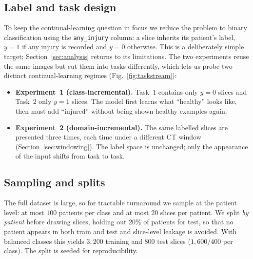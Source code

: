 \documentclass[11pt]{article}
\begin{document}
\subsection{Label and task design}
To keep the continual-learning question in focus we reduce the problem to binary
classification using the \texttt{any\_injury} column: a slice inherits its
patient's label, $y=1$ if any injury is recorded and $y=0$ otherwise. This is a
deliberately simple target; Section~\ref{sec:analysis} returns to its limitations. The
two experiments reuse the same images but cut them into tasks differently, which
lets us probe two distinct continual-learning regimes (Fig.~\ref{fig:taskstream}):
\begin{itemize}[leftmargin=1.4em,topsep=2pt,itemsep=2pt]
  \item \textbf{Experiment~1 (class-incremental).} Task~1 contains only $y=0$
        slices and Task~2 only $y=1$ slices. The model first learns what
        ``healthy'' looks like, then must add ``injured'' without being shown
        healthy examples again.
  \item \textbf{Experiment~2 (domain-incremental).} The same labelled slices are
        presented three times, each time under a different CT window
        (Section~\ref{sec:windowing}). The label space is unchanged; only the
        appearance of the input shifts from task to task.
\end{itemize}

\subsection{Sampling and splits}
The full dataset is large, so for tractable turnaround we sample at the patient
level: at most $100$ patients per class and at most $20$ slices per patient. We
split \emph{by patient} before drawing slices, holding out $20\%$ of patients for
test, so that no patient appears in both train and test and slice-level leakage is
avoided. With balanced classes this yields $3{,}200$ training and $800$ test
slices ($1{,}600$/$400$ per class). The split is seeded for reproducibility.
\end{document}
